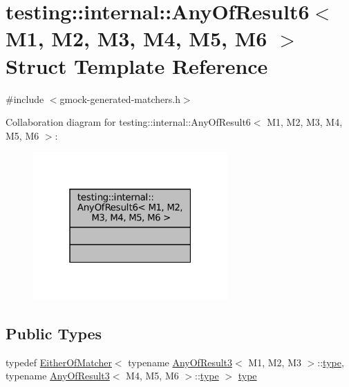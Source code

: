 \hypertarget{structtesting_1_1internal_1_1AnyOfResult6}{}\section{testing\+:\+:internal\+:\+:Any\+Of\+Result6$<$ M1, M2, M3, M4, M5, M6 $>$ Struct Template Reference}
\label{structtesting_1_1internal_1_1AnyOfResult6}


{\ttfamily \#include $<$gmock-\/generated-\/matchers.\+h$>$}



Collaboration diagram for testing\+:\+:internal\+:\+:Any\+Of\+Result6$<$ M1, M2, M3, M4, M5, M6 $>$\+:
\nopagebreak
\begin{figure}[H]
\begin{center}
\leavevmode
\includegraphics[width=211pt]{structtesting_1_1internal_1_1AnyOfResult6__coll__graph}
\end{center}
\end{figure}
\subsection*{Public Types}
\begin{DoxyCompactItemize}
\item 
typedef \hyperlink{classtesting_1_1internal_1_1EitherOfMatcher}{Either\+Of\+Matcher}$<$ typename \hyperlink{structtesting_1_1internal_1_1AnyOfResult3}{Any\+Of\+Result3}$<$ M1, M2, M3 $>$\+::\hyperlink{structtesting_1_1internal_1_1AnyOfResult6_a15837eb05d9ac5a76c20d344a4988dd1}{type}, typename \hyperlink{structtesting_1_1internal_1_1AnyOfResult3}{Any\+Of\+Result3}$<$ M4, M5, M6 $>$\+::\hyperlink{structtesting_1_1internal_1_1AnyOfResult6_a15837eb05d9ac5a76c20d344a4988dd1}{type} $>$ \hyperlink{structtesting_1_1internal_1_1AnyOfResult6_a15837eb05d9ac5a76c20d344a4988dd1}{type}
\end{DoxyCompactItemize}


